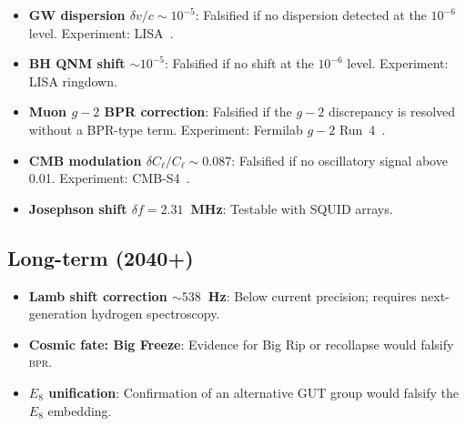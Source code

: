 \documentclass[aps,prd,twocolumn,superscriptaddress,longbibliography,nofootinbib]{revtex4-2}
\newcommand{\bpr}{\textsc{bpr}}
\begin{document}
\begin{itemize}
\item \textbf{GW dispersion $\delta v/c \sim 10^{-5}$}: Falsified
  if no dispersion detected at the $10^{-6}$ level.  Experiment:
  LISA~\cite{LISA2023}.

\item \textbf{BH QNM shift $\sim 10^{-5}$}: Falsified if no
  shift at the $10^{-6}$ level.  Experiment: LISA ringdown.

\item \textbf{Muon $g-2$ BPR correction}: Falsified if the $g-2$
  discrepancy is resolved without a BPR-type term.  Experiment:
  Fermilab $g-2$ Run~4~\cite{FermilabG2}.

\item \textbf{CMB modulation $\delta C_\ell/C_\ell \sim 0.087$}:
  Falsified if no oscillatory signal above 0.01.  Experiment:
  CMB-S4~\cite{CMBS4}.

\item \textbf{Josephson shift $\delta f = 2.31$~MHz}: Testable with
  SQUID arrays.
\end{itemize}

\subsection{Long-term (2040+)}

\begin{itemize}
\item \textbf{Lamb shift correction $\sim 538$~Hz}: Below current
  precision; requires next-generation hydrogen spectroscopy.

\item \textbf{Cosmic fate: Big Freeze}: Evidence for Big Rip or
  recollapse would falsify \bpr.

\item \textbf{$E_8$ unification}: Confirmation of an alternative
  GUT group would falsify the $E_8$ embedding.
\end{itemize}


\end{document}
